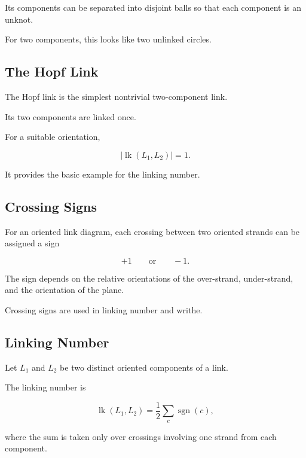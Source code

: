 Its components can be separated into disjoint balls so that each component
is an unknot.

For two components, this looks like two unlinked circles.

\subsection{The Hopf Link}
\label{subsec:hopf-link}

The Hopf link is the simplest nontrivial two-component link.

Its two components are linked once.

For a suitable orientation,

\[
\boxed{
|\operatorname{lk}(L_1,L_2)|=1.
}
\]

It provides the basic example for the linking number.

\subsection{Crossing Signs}
\label{subsec:crossing-signs}

For an oriented link diagram, each crossing between two oriented strands can
be assigned a sign

\[
\boxed{
+1
\qquad\text{or}\qquad
-1.
}
\]

The sign depends on the relative orientations of the over-strand,
under-strand, and the orientation of the plane.

Crossing signs are used in linking number and writhe.

\subsection{Linking Number}
\label{subsec:linking-number}

Let \(L_1\) and \(L_2\) be two distinct oriented components of a link.

The linking number is

\[
\boxed{
\operatorname{lk}(L_1,L_2)
=
\frac12
\sum_{c}
\operatorname{sgn}(c),
}
\]

where the sum is taken only over crossings involving one strand from each
component.

